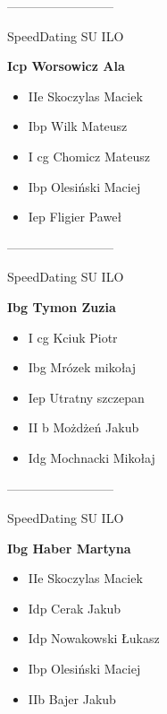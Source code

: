 \documentclass[a4paper,10pt]{article}
\begin{document}
\begin{multicols}{3}
\begin{minipage}[l]{\textwidth}
\begin{itemize}
    \end{itemize}



\end{minipage}



\begin{minipage}[l]{\textwidth}
--------------------------

  \footnotesize{SpeedDating SU ILO}

  \bfseries{Icp Worsowicz Ala}

  \begin{itemize}
    \item IIe Skoczylas Maciek
    \item Ibp Wilk Mateusz
    \item I cg Chomicz Mateusz
    \item Ibp Olesiński Maciej
    \item Iep Fligier Paweł

    \end{itemize}



\end{minipage}



\begin{minipage}[l]{\textwidth}
--------------------------

  \footnotesize{SpeedDating SU ILO}

  \bfseries{Ibg Tymon Zuzia}

  \begin{itemize}
    \item I cg Kciuk Piotr
    \item Ibg Mrózek mikołaj
    \item Iep Utratny szczepan
    \item II b Możdżeń Jakub
    \item Idg Mochnacki Mikołaj

    \end{itemize}



\end{minipage}



\begin{minipage}[l]{\textwidth}
--------------------------

  \footnotesize{SpeedDating SU ILO}

  \bfseries{Ibg Haber Martyna}

  \begin{itemize}
    \item IIe Skoczylas Maciek
    \item Idp Cerak Jakub
    \item Idp Nowakowski Łukasz
    \item Ibp Olesiński Maciej
    \item IIb Bajer Jakub


\end{itemize}
\end{minipage}
\end{multicols}
\end{document}
